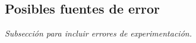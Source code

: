 \subsection*{Posibles fuentes de error}

\textit{Subsección para incluir errores de experimentación.}

